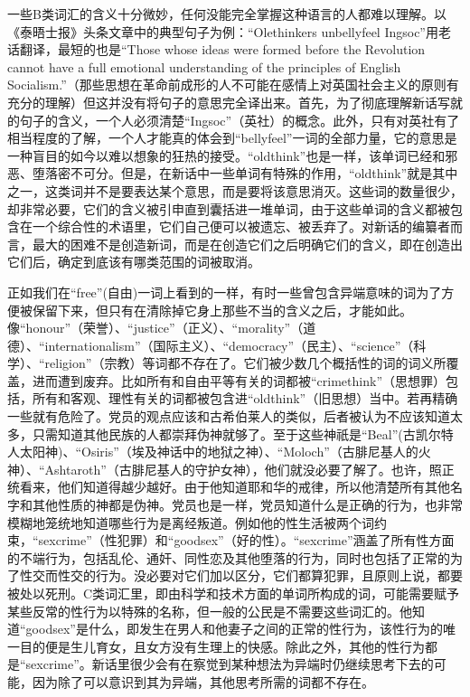 一些B类词汇的含义十分微妙，任何没能完全掌握这种语言的人都难以理解。以《泰晤士报》头条文章中的典型句子为例：``Olethinkers
unbellyfeel Ingsoc''用老话翻译，最短的也是``Those whose ideas were
formed before the Revolution cannot have a full emotional understanding
of the principles of English
Socialism.''（那些思想在革命前成形的人不可能在感情上对英国社会主义的原则有充分的理解）但这并没有将句子的意思完全译出来。首先，为了彻底理解新话写就的句子的含义，一个人必须清楚``Ingsoc''（英社）的概念。此外，只有对英社有了相当程度的了解，一个人才能真的体会到``bellyfeel''一词的全部力量，它的意思是一种盲目的如今以难以想象的狂热的接受。``oldthink''也是一样，该单词已经和邪恶、堕落密不可分。但是，在新话中一些单词有特殊的作用，``oldthink''就是其中之一，这类词并不是要表达某个意思，而是要将该意思消灭。这些词的数量很少，却非常必要，它们的含义被引申直到囊括进一堆单词，由于这些单词的含义都被包含在一个综合性的术语里，它们自己便可以被遗忘、被丢弃了。对新话的编纂者而言，最大的困难不是创造新词，而是在创造它们之后明确它们的含义，即在创造出它们后，确定到底该有哪类范围的词被取消。

正如我们在``free''(自由)一词上看到的一样，有时一些曾包含异端意味的词为了方便被保留下来，但只有在清除掉它身上那些不当的含义之后，才能如此。像``honour''（荣誉）、``justice''（正义）、``morality''（道德）、``internationalism''（国际主义）、``democracy''（民主）、``science''（科学）、``religion''（宗教）等词都不存在了。它们被少数几个概括性的词的词义所覆盖，进而遭到废弃。比如所有和自由平等有关的词都被``crimethink''（思想罪）包括，所有和客观、理性有关的词都被包含进``oldthink''（旧思想）当中。若再精确一些就有危险了。党员的观点应该和古希伯莱人的类似，后者被认为不应该知道太多，只需知道其他民族的人都崇拜伪神就够了。至于这些神祇是``Beal''(古凯尔特人太阳神)、``Osiris''（埃及神话中的地狱之神）、``Moloch''（古腓尼基人的火神）、``Ashtaroth''（古腓尼基人的守护女神），他们就没必要了解了。也许，照正统看来，他们知道得越少越好。由于他知道耶和华的戒律，所以他清楚所有其他名字和其他性质的神都是伪神。党员也是一样，党员知道什么是正确的行为，也非常模糊地笼统地知道哪些行为是离经叛道。例如他的性生活被两个词约束，``sexcrime''（性犯罪）和``goodsex''（好的性）。``sexcrime''涵盖了所有性方面的不端行为，包括乱伦、通奸、同性恋及其他堕落的行为，同时也包括了正常的为了性交而性交的行为。没必要对它们加以区分，它们都算犯罪，且原则上说，都要被处以死刑。C类词汇里，即由科学和技术方面的单词所构成的词，可能需要赋予某些反常的性行为以特殊的名称，但一般的公民是不需要这些词汇的。他知道``goodsex''是什么，即发生在男人和他妻子之间的正常的性行为，该性行为的唯一目的便是生儿育女，且女方没有生理上的快感。除此之外，其他的性行为都是``sexcrime''。新话里很少会有在察觉到某种想法为异端时仍继续思考下去的可能，因为除了可以意识到其为异端，其他思考所需的词都不存在。

